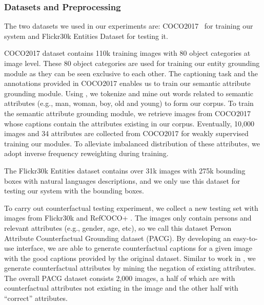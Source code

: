 \subsubsection{Datasets and Preprocessing}
The two datasets we used in our experiments are:
COCO2017~\citep{lin2014microsoft} for training our system
and Flickr30k Entities Dataset \citep{plummer2015flickr30k} for testing it.

COCO2017 dataset contains 110k training images with 80 object categories at image level.
These 80 object categories are used for training our entity grounding module as they can be
seen exclusive to each other.
The captioning task and the annotations provided in COCO2017 enables us to train
our semantic attribute grounding module. Using \citep{bird2009natural,miller1998wordnet}, we tokenize and mine out words related to semantic attributes
(e.g., man, woman, boy, old and young) to form our corpus.
To train the semantic attribute grounding module,
we retrieve images from COCO2017 whose captions contain the attributes existing in our corpus.
Eventually,
10,000 images and 34 attributes are collected from COCO2017 for weakly supervised training our modules.
To alleviate imbalanced distribution of these attributes,
we adopt inverse frequency reweighting during training.

The Flickr30k Entities dataset contains over 31k images with 275k bounding boxes with natural languages descriptions,
and we only use this dataset for testing our system with the bounding boxes.

To carry out counterfactual testing experiment,
we collect a new testing set with images from Flickr30k and RefCOCO+ \citep{kazemzadeh2014referitgame}.
The images only contain persons and relevant attributes (e.g., gender, age, etc),
so we call this dataset Person Attribute Counterfactual Grounding dataset (PACG).
By developing an easy-to-use interface,
we are able to generate counterfactual captions for a given image with the good captions provided by the original dataset. Similar to work in \citep{hendricks2018generating}, we generate counterfactual attributes by mining the negation of existing attributes. The overall PACG dataset consists 2,000 images,
a half of which are with counterfactual attributes not existing in the image
and the other half with ``correct'' attributes.


